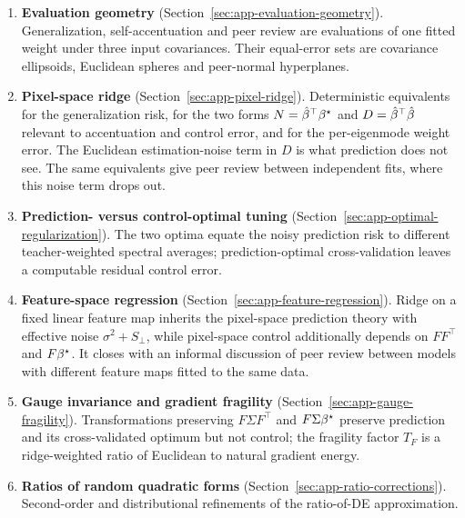\begin{enumerate}
\item \textbf{Evaluation geometry} (Section~\ref{sec:app-evaluation-geometry}).
Generalization, self-accentuation and peer review are evaluations of one
fitted weight under three input covariances.  Their equal-error sets are
covariance ellipsoids, Euclidean spheres and peer-normal hyperplanes.
\item \textbf{Pixel-space ridge} (Section~\ref{sec:app-pixel-ridge}).
Deterministic equivalents for the generalization risk, for the two forms $N={\hat{\beta}}^\top{\beta^{\star}}$ and $D={\hat{\beta}}^\top\hat{\beta}$ relevant to accentuation and control error, and for
the per-eigenmode weight error. 
The Euclidean estimation-noise term in $D$ is what prediction does not see.
The same equivalents give peer review between independent fits, where
this noise term drops out.
\item \textbf{Prediction- versus control-optimal tuning}
(Section~\ref{sec:app-optimal-regularization}).  The two optima equate the
noisy prediction risk to different teacher-weighted spectral averages;
prediction-optimal cross-validation leaves a computable residual control
error.
\item \textbf{Feature-space regression} (Section~\ref{sec:app-feature-regression}).
Ridge on a fixed linear feature map inherits the pixel-space prediction
theory with effective noise $\sigma^2+S_\perp$, while pixel-space control
additionally depends on $FF^\top$ and $F{\beta^{\star}}$.  It closes with an
informal discussion of peer review between models with different feature
maps fitted to the same data.
\item \textbf{Gauge invariance and gradient fragility}
(Section~\ref{sec:app-gauge-fragility}).  Transformations preserving
$F\Sigma F^\top$ and $F\Sigma{\beta^{\star}}$ preserve prediction and its
cross-validated optimum but not control; the fragility factor $T_F$ is a
ridge-weighted ratio of Euclidean to natural gradient energy.
\item \textbf{Ratios of random quadratic forms}
(Section~\ref{sec:app-ratio-corrections}).  Second-order and
distributional refinements of the ratio-of-DE approximation.

\end{enumerate}
